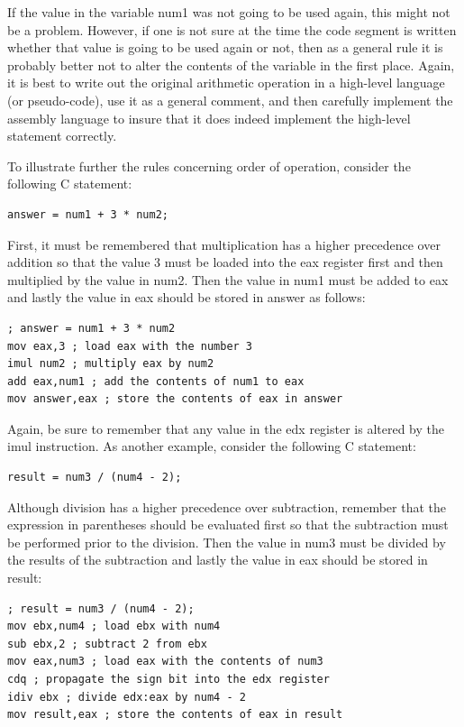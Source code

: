 \documentclass[10pt]{article}
\begin{document}
If the value in the variable num1 was not going to be used again, this might not be a problem. However, if one is not sure at the time the code segment is written whether that value is going to be used again or not, then as a general rule it is probably better not to alter the contents of the variable in the first place. Again, it is best to write out the original arithmetic operation in a high-level language (or pseudo-code), use it as a general comment, and then carefully implement the assembly language to insure that it does indeed implement the high-level statement correctly.

To illustrate further the rules concerning order of operation, consider the following C statement:

\begin{verbatim}
answer = num1 + 3 * num2;
\end{verbatim}

First, it must be remembered that multiplication has a higher precedence over addition so that the value 3 must be loaded into the eax register first and then multiplied by the value in num2. Then the value in num1 must be added to eax and lastly the value in eax should be stored in answer as follows:

\begin{verbatim}
; answer = num1 + 3 * num2
mov eax,3 ; load eax with the number 3
imul num2 ; multiply eax by num2
add eax,num1 ; add the contents of num1 to eax
mov answer,eax ; store the contents of eax in answer
\end{verbatim}

Again, be sure to remember that any value in the edx register is altered by the imul instruction. As another example, consider the following C statement:

\begin{verbatim}
result = num3 / (num4 - 2);
\end{verbatim}

Although division has a higher precedence over subtraction, remember that the expression in parentheses should be evaluated first so that the subtraction must be performed prior to the division. Then the value in num3 must be divided by the results of the subtraction and lastly the value in eax should be stored in result:

\begin{verbatim}
; result = num3 / (num4 - 2);
mov ebx,num4 ; load ebx with num4
sub ebx,2 ; subtract 2 from ebx
mov eax,num3 ; load eax with the contents of num3
cdq ; propagate the sign bit into the edx register
idiv ebx ; divide edx:eax by num4 - 2
mov result,eax ; store the contents of eax in result
\end{verbatim}
\end{document}
